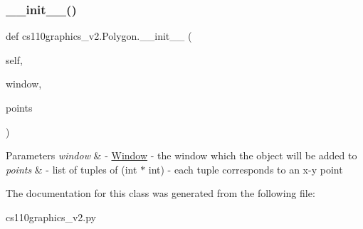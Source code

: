 \subsubsection{\texorpdfstring{\_\_init\_\_()}{\_\_init\_\_()}}
{\footnotesize\ttfamily def cs110graphics\+\_\+v2.\+Polygon.\+\_\+\+\_\+init\+\_\+\+\_\+ (\begin{DoxyParamCaption}\item[{}]{self,  }\item[{}]{window,  }\item[{}]{points }\end{DoxyParamCaption})}


\begin{DoxyParams}{Parameters}
{\em window} & -\/ \mbox{\hyperlink{classcs110graphics__v2_1_1Window}{Window}} -\/ the window which the object will be added to \\
\hline
{\em points} & -\/ list of tuples of (int $\ast$ int) -\/ each tuple corresponds to an x-\/y point \\
\hline
\end{DoxyParams}


The documentation for this class was generated from the following file\+:\begin{DoxyCompactItemize}
\item 
cs110graphics\+\_\+v2.\+py\end{DoxyCompactItemize}
